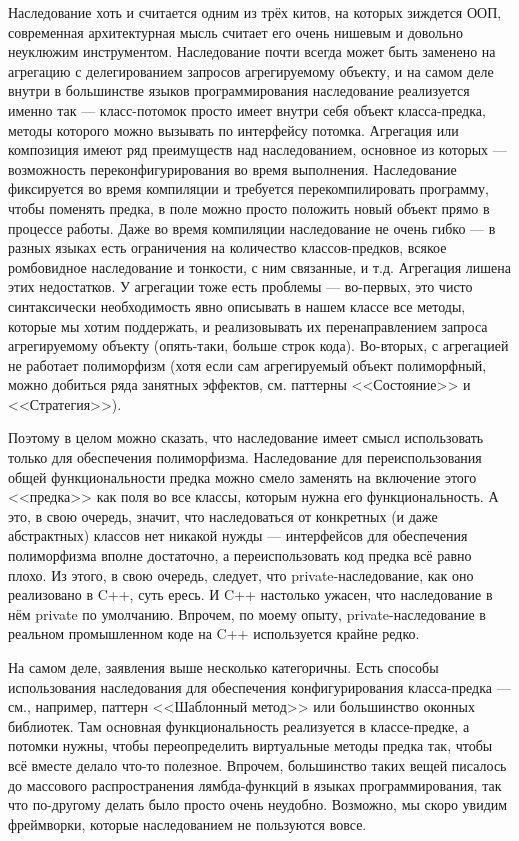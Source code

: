 \documentclass{../text-style}
\begin{document}
Наследование хоть и считается одним из трёх китов, на которых зиждется ООП, современная архитектурная мысль считает его очень нишевым и довольно неуклюжим инструментом. Наследование почти всегда может быть заменено на агрегацию с делегированием запросов агрегируемому объекту, и на самом деле внутри в большинстве языков программирования наследование реализуется именно так --- класс-потомок просто имеет внутри себя объект класса-предка, методы которого можно вызывать по интерфейсу потомка. Агрегация или композиция имеют ряд преимуществ над наследованием, основное из которых --- возможность переконфигурирования во время выполнения. Наследование фиксируется во время компиляции и требуется перекомпилировать программу, чтобы поменять предка, в поле можно просто положить новый объект прямо в процессе работы. Даже во время компиляции наследование не очень гибко --- в разных языках есть ограничения на количество классов-предков, всякое ромбовидное наследование и тонкости, с ним связанные, и т.д. Агрегация лишена этих недостатков. У агрегации тоже есть проблемы --- во-первых, это чисто синтаксически необходимость явно описывать в нашем классе все методы, которые мы хотим поддержать, и реализовывать их перенаправлением запроса агрегируемому объекту (опять-таки, больше строк кода). Во-вторых, с агрегацией не работает полиморфизм (хотя если сам агрегируемый объект полиморфный, можно добиться ряда занятных эффектов, см. паттерны <<Состояние>> и <<Стратегия>>).

Поэтому в целом можно сказать, что наследование имеет смысл использовать только для обеспечения полиморфизма. Наследование для переиспользования общей функциональности предка можно смело заменять на включение этого <<предка>> как поля во все классы, которым нужна его функциональность. А это, в свою очередь, значит, что наследоваться от конкретных (и даже абстрактных) классов нет никакой нужды --- интерфейсов для обеспечения полиморфизма вполне достаточно, а переиспользовать код предка всё равно плохо. Из этого, в свою очередь, следует, что private-наследование, как оно реализовано в C++, суть ересь. И C++ настолько ужасен, что наследование в нём private по умолчанию. Впрочем, по моему опыту, private-наследование в реальном промышленном коде на C++ используется крайне редко.

На самом деле, заявления выше несколько категоричны. Есть способы использования наследования для обеспечения конфигурирования класса-предка --- см., например, паттерн <<Шаблонный метод>> или большинство оконных библиотек. Там основная функциональность реализуется в классе-предке, а потомки нужны, чтобы переопределить виртуальные методы предка так, чтобы всё вместе делало что-то полезное. Впрочем, большинство таких вещей писалось до массового распространения лямбда-функций в языках программирования, так что по-другому делать было просто очень неудобно. Возможно, мы скоро увидим фреймворки, которые наследованием не пользуются вовсе.
\end{document}
